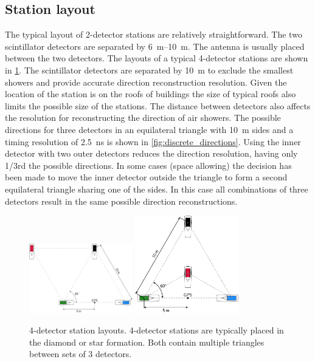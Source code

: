 \subsection{Station layout}
\label{sec:station_layout}

The typical layout of 2-detector stations are relatively straightforward. The two scintillator detectors are separated by \SIrange{6}{10}{\meter}. The \gps antenna is usually placed between the two detectors. The layouts of a typical 4-detector stations are shown in \cref{fig:4_detector_layouts}. The scintillator detectors are separated by \SI{10}{\meter} to exclude the smallest showers and provide accurate direction reconstruction resolution. Given the location of the station is on the roofs of buildings the size of typical roofs also limits the possible size of the stations. The distance between detectors also affects the resolution for reconstructing the direction of air showers. The possible directions for three detectors in an equilateral triangle with \SI{10}{\meter} sides and a timing resolution of \SI{2.5}{\ns} is shown in \cref{fig:discrete_directions}. Using the inner detector with two outer detectors reduces the direction resolution, having only 1/3rd the possible directions. In some cases (space allowing) the decision has been made to move the inner detector outside the triangle to form a second equilateral triangle sharing one of the sides. In this case all combinations of three detectors result in the same possible direction reconstructions.

\begin{figure}
    \centering
    \includegraphics[width=0.4\textwidth]
                    {plots/station/4_detector_diamond}
    \includegraphics[width=0.4\textwidth]
                    {plots/station/4_detector_star}
    \caption{4-detector station layouts. 4-detector stations are typically placed in the diamond or star formation. Both contain multiple triangles between sets of 3 detectors.}
    \label{fig:4_detector_layouts}
\end{figure}

